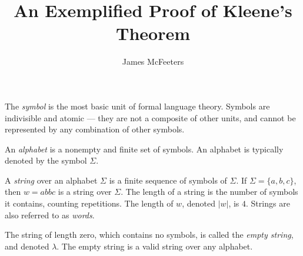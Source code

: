 \documentclass{bcthesis}
\title{An Exemplified Proof of Kleene's Theorem}
\author{James McFeeters}
\newif\ifbuildfrontmatter
\renewcommand{\meo}[1]{}
\newcommand{\footcite}[2]{\footnote{\cite[pg.~{#2}]{#1}}}
\renewcommand{\footcite}[2]{\cite[pg.~{#2}]{#1}}
\begin{document}
\ifbuildfrontmatter
\frontmatter

	\maketitle

	\begin{abstract}
		\meo{This is a placeholder abstract!}

		This paper gives a standard proof of Kleene's theorem, with examples to help illuminate particular facets of the proof.
		Kleene's theorem establishes the equivalence of finite automata and the class of regular languages, allowing for the implementation of fast search algorithms using regular expressions.

		\meo{This is a placeholder abstract!}
	\end{abstract}


	\begin{acknowledgments}
		Here you should acknowledge any special help on your project, or particular influences on your life or mathematical development.
	\end{acknowledgments}

	\tableofcontents
\fi

\mainmatter

\label{ch:basics}

		\begin{definition}[Symbol]
			The \textit{symbol} is the most basic unit of formal language theory.
			Symbols are indivisible and atomic --- they are not a composite of other units, and cannot be represented by any combination of other symbols.\footcite{hopcroft}{1}
		\end{definition}

		\begin{definition}[Alphabet]
			An \textit{alphabet} is a nonempty and finite set of symbols.
			An alphabet is typically denoted by the symbol $\Sigma$.\footcite{salomaa}{1}
		\end{definition}

		\begin{definition}[String]
			A \textit{string} over an alphabet $\Sigma$ is a finite sequence of symbols of $\Sigma$.
			If $\Sigma = \{ a, b ,c \}$, then $w = abbc$ is a string over $\Sigma$.
			The length of a string is the number of symbols it contains, counting repetitions.
			The length of $w$, denoted $|w|$, is $4$.
			Strings are also referred to as \textit{words}.\footcite{hopcroft}{1}

			The string of length zero, which contains no symbols, is called the \textit{empty string}, and denoted $\lambda$.
			The empty string is a valid string over any alphabet.\footcite{salomaa}{1}
		\end{definition}
\end{document}
